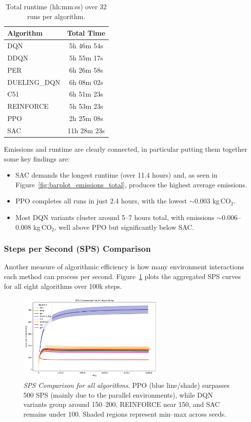 \begin{table} 
	\centering
	\caption{Total runtime (hh:mm:ss) over 32 runs per algorithm.}
	\label{tab:total_runtimes}
	\begin{tabular}{lc}
		\toprule
		\textbf{Algorithm} & \textbf{Total Time} \\
		\midrule
		DQN          & 5h 46m 54s \\
		DDQN         & 5h 55m 17s \\
		PER          & 6h 26m 58s \\
		DUELING\_DQN & 6h 08m 02s \\
		C51          & 6h 51m 23s \\
		REINFORCE    & 5h 53m 23s \\
		PPO          & 2h 25m 08s \\
		SAC          & 11h 28m 23s \\
		\bottomrule
	\end{tabular}
\end{table}

Emissions and runtime are clearly connected, in particular putting them together some key findings are:
\begin{itemize}
	\item SAC demands the longest runtime (over 11.4 hours) and, as seen in 
	Figure~\ref{fig:barplot_emissions_total}, produces the highest average emissions. 
	\item PPO completes all runs in just 2.4 hours, with the lowest \(\sim0.003\) 
	kg\,CO$_2$. 
	\item Most DQN variants cluster around 5--7 hours total, with emissions 
	\(\sim0.006\)--0.008 kg\,CO$_2$, well above PPO but significantly below SAC.
\end{itemize}

\subsubsection{Steps per Second (SPS) Comparison}
Another measure of algorithmic efficiency is how many environment interactions each method 
can process per second. Figure~\ref{fig:sps_all} plots the aggregated SPS curves for all 
eight algorithms over 100k steps.

\begin{figure} 
	\centering
	\includegraphics[width=0.65\textwidth]{figures/comparison/sps_all.png}
	\caption{\emph{SPS Comparison for all algorithms}. PPO (blue line/shade) surpasses 
		500 SPS (mainly due to the parallel environments), while DQN variants group around 150--200, REINFORCE near 150, and SAC remains 
		under 100. Shaded regions represent min--max across seeds.}
	\label{fig:sps_all}
\end{figure}

